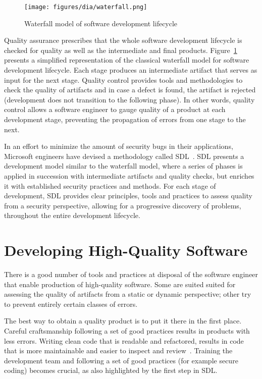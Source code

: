 \begin{figure}[h]
    \centering
    \texttt{[image: figures/dia/waterfall.png]}
    \caption{Waterfall model of software development lifecycle}
    \label{fig:waterfall}
\end{figure}

Quality assurance prescribes that the whole software development lifecycle is
checked for quality as well as the intermediate and final products.
Figure~\ref{fig:waterfall} presents a simplified representation of the classical
waterfall model for software development lifecycle. Each stage produces an
intermediate artifact that serves as input for the next stage. Quality control
provides tools and methodologies to check the quality of artifacts and in case a
defect is found, the artifact is rejected (development does not transition to
the following phase). In other words, quality control allows a software engineer
to gauge quality of a product at each development stage, preventing the
propagation of errors from one stage to the next.

In an effort to minimize the amount of security bugs in their applications,
Microsoft engineers have devised a methodology called
\ac{SDL}~\cite{lipner2004trustworthy}. \ac{SDL} presents a development model
similar to the waterfall model, where a series of phases is applied in
succession with intermediate artifacts and quality checks, but enriches it with
established security practices and methods. For each stage of development,
\ac{SDL} provides clear principles, tools and practices to assess quality from a
security perspective, allowing for a progressive discovery of problems,
throughout the entire development lifecycle.

\section{Developing High-Quality Software}
\label{sec:dev-hq-sw}
There is a good number of tools and practices at disposal of the software
engineer that enable production of high-quality software. Some are suited suited
for assessing the quality of artifacts from a static or dynamic perspective;
other try to prevent entirely certain classes of errors.

The best way to obtain a quality product is to put it there in the first place.
Careful craftsmanship following a set of good practices results in products with
less errors. Writing clean code that is readable and refactored, results in code
that is more maintainable and easier to inspect and
review~\cite{martin2009clean,fowler1999refactoring}. Training the development
team and following a set of good practices (for example secure coding) becomes
crucial, as also highlighted by the first step in \ac{SDL}.

